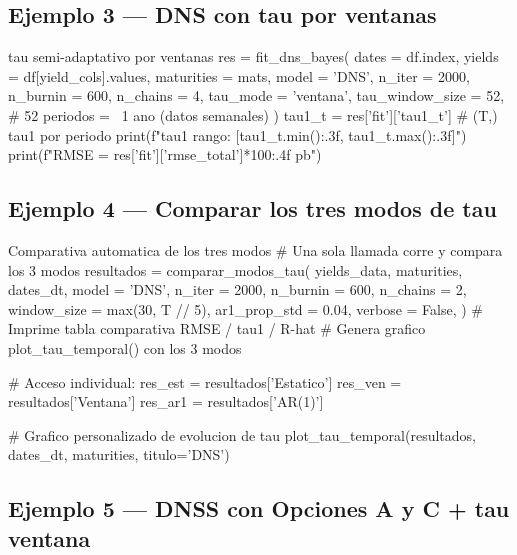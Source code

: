 \documentclass[12pt, a4paper]{article}
\theoremstyle{plain}
\theoremstyle{definition}
\theoremstyle{remark}
\begin{document}
\subsection{Ejemplo 3 --- DNS con tau por ventanas}

\begin{codigocaja}{tau semi-adaptativo por ventanas}
res = fit_dns_bayes(
    dates      = df.index,
    yields     = df[yield_cols].values,
    maturities = mats,
    model      = 'DNS',
    n_iter     = 2000,
    n_burnin   = 600,
    n_chains   = 4,
    tau_mode        = 'ventana',
    tau_window_size = 52,          # 52 periodos = ~1 ano (datos semanales)
)
tau1_t = res['fit']['tau1_t']      # (T,) tau1 por periodo
print(f"tau1 rango: [{tau1_t.min():.3f}, {tau1_t.max():.3f}]")
print(f"RMSE = {res['fit']['rmse_total']*100:.4f} pb")
\end{codigocaja}

\subsection{Ejemplo 4 --- Comparar los tres modos de tau}

\begin{codigocaja}{Comparativa automatica de los tres modos}
# Una sola llamada corre y compara los 3 modos
resultados = comparar_modos_tau(
    yields_data, maturities, dates_dt,
    model        = 'DNS',
    n_iter       = 2000,
    n_burnin     = 600,
    n_chains     = 2,
    window_size  = max(30, T // 5),
    ar1_prop_std = 0.04,
    verbose      = False,
)
# Imprime tabla comparativa RMSE / tau1 / R-hat
# Genera grafico plot_tau_temporal() con los 3 modos

# Acceso individual:
res_est    = resultados['Estatico']
res_ven    = resultados['Ventana']
res_ar1    = resultados['AR(1)']

# Grafico personalizado de evolucion de tau
plot_tau_temporal(resultados, dates_dt, maturities, titulo='DNS')
\end{codigocaja}

\subsection{Ejemplo 5 --- DNSS con Opciones A y C + tau ventana}
\end{document}
